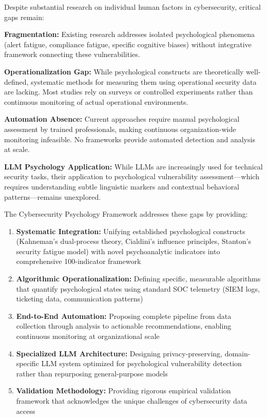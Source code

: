 \documentclass[11pt, a4paper]{article}
\begin{document}
Despite substantial research on individual human factors in cybersecurity, critical gaps remain:

\textbf{Fragmentation:} Existing research addresses isolated psychological phenomena (alert fatigue, compliance fatigue, specific cognitive biases) without integrative framework connecting these vulnerabilities.

\textbf{Operationalization Gap:} While psychological constructs are theoretically well-defined, systematic methods for measuring them using operational security data are lacking. Most studies rely on surveys or controlled experiments rather than continuous monitoring of actual operational environments.

\textbf{Automation Absence:} Current approaches require manual psychological assessment by trained professionals, making continuous organization-wide monitoring infeasible. No frameworks provide automated detection and analysis at scale.

\textbf{LLM Psychology Application:} While LLMs are increasingly used for technical security tasks, their application to psychological vulnerability assessment—which requires understanding subtle linguistic markers and contextual behavioral patterns—remains unexplored.

The Cybersecurity Psychology Framework addresses these gaps by providing:

\begin{enumerate}
\item \textbf{Systematic Integration:} Unifying established psychological constructs (Kahneman's dual-process theory, Cialdini's influence principles, Stanton's security fatigue model) with novel psychoanalytic indicators into comprehensive 100-indicator framework
\item \textbf{Algorithmic Operationalization:} Defining specific, measurable algorithms that quantify psychological states using standard SOC telemetry (SIEM logs, ticketing data, communication patterns)
\item \textbf{End-to-End Automation:} Proposing complete pipeline from data collection through analysis to actionable recommendations, enabling continuous monitoring at organizational scale
\item \textbf{Specialized LLM Architecture:} Designing privacy-preserving, domain-specific LLM system optimized for psychological vulnerability detection rather than repurposing general-purpose models
\item \textbf{Validation Methodology:} Providing rigorous empirical validation framework that acknowledges the unique challenges of cybersecurity data access
\end{enumerate}
\end{document}
